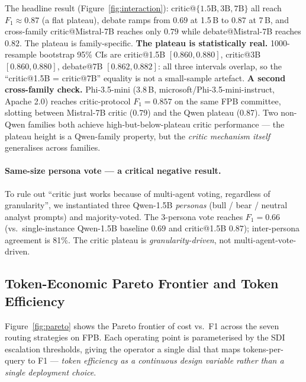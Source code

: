 The headline result (Figure~\ref{fig:interaction}):
critic@$\{1.5\text{B},3\text{B},7\text{B}\}$ all reach $F_1\!\approx\!0.87$
(a flat plateau), debate ramps from $0.69$ at 1.5\,B to $0.87$ at
7\,B, and cross-family critic@Mistral-7B reaches only $0.79$ while
debate@Mistral-7B reaches $0.82$. The plateau is family-specific.
\textbf{The plateau is statistically real.} 1000-resample bootstrap
95\% CIs are critic@1.5B $[0.860,0.880]$, critic@3B $[0.860,0.880]$,
debate@7B $[0.862,0.882]$: all three intervals overlap, so the
``critic@1.5B = critic@7B'' equality is not a small-sample artefact.
\textbf{A second cross-family check.} Phi-3.5-mini (3.8\,B,
microsoft/Phi-3.5-mini-instruct, Apache 2.0) reaches
critic-protocol $F_1\!=\!0.857$ on the same FPB committee, slotting
between Mistral-7B critic (0.79) and the Qwen plateau (0.87). Two
non-Qwen families both achieve high-but-below-plateau critic
performance --- the plateau height is a Qwen-family property, but the
\emph{critic mechanism itself} generalises across families.

\paragraph{Same-size persona vote --- a critical negative result.}
To rule out ``critic just works because of multi-agent voting,
regardless of granularity'', we instantiated three Qwen-1.5B
\emph{personas} (bull / bear / neutral analyst prompts) and
majority-voted. The 3-persona vote reaches $F_1\!=\!0.66$
(vs.\ single-instance Qwen-1.5B baseline $0.69$ and critic@1.5B
$0.87$); inter-persona agreement is 81\%. The critic plateau is
\emph{granularity-driven}, not multi-agent-vote-driven.

\subsection{Token-Economic Pareto Frontier and Token Efficiency}
\label{sec:experiments:pareto}

Figure~\ref{fig:pareto} shows the Pareto frontier of cost vs.\ F1
across the seven routing strategies on FPB. Each operating point
is parameterised by the SDI escalation thresholds, giving the
operator a single dial that maps tokens-per-query to F1 ---
\emph{token efficiency as a continuous design variable rather than
a single deployment choice}.

